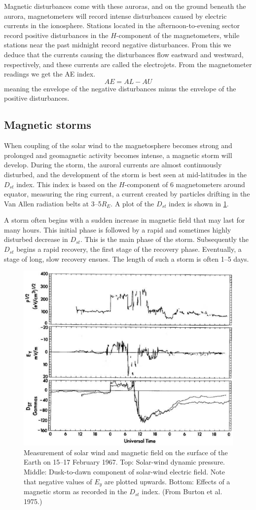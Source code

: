 Magnetic disturbances come with these auroras, and on the ground beneath the aurora, magnetometers will record intense disturbances caused by electric currents in the ionosphere. Stations located in the afternoon-to-evening sector record positive disturbances in the \(H\)-component of the magnetometers, while stations near the past midnight record negative disturbances. From this we deduce that the currents causing the disturbances flow eastward and westward, respectively, and these currents are called the electrojets. From the magnetometer readings we get the AE index.
\begin{equation*}
    AE=AL-AU
\end{equation*}
meaning the envelope of the negative disturbances minus the envelope of the positive disturbances.

\subsection{Magnetic storms}
When coupling of the solar wind to the magnetosphere becomes strong and prolonged and geomagnetic activity becomes intense, a magnetic storm will develop. During the storm, the auroral currents are almost continuously disturbed, and the development of the storm is best seen at mid-latitudes in the \(D_{st}\) index. This index is based on the \(H\)-component of 6 magnetometers around equator, measuring the ring current, a current created by particles drifting in the Van Allen radiation belts at 3--5\(R_E\). A plot of the \(D_{st}\) index is shown in \cref{fig:L13_dst_index}.

A storm often begins with a sudden increase in magnetic field that may last for many hours. This initial phase is followed by a rapid and sometimes highly disturbed decrease in \(D_{st}\). This is the main phase of the storm. Subsequently the \(D_{st}\) begins a rapid recovery, the first stage of the recovery phase. Eventually, a stage of long, slow recovery ensues. The length of such a storm is often 1--5 days.
\begin{figure}[t]
    \centering
    \includegraphics[width=.6\linewidth]{bilder/L13_dst_index.jpg}
    \caption{Measurement of solar wind and magnetic field on the surface of the Earth on 15--17 February 1967. Top: Solar-wind dynamic pressure. Middle: Dusk-to-dawn component of solar-wind electric field. Note that negative values of \(E_y\) are plotted upwards. Bottom: Effects of a magnetic storm as recorded in the \(D_{st}\) index. (From Burton et al. 1975.)}\label{fig:L13_dst_index}
\end{figure}

